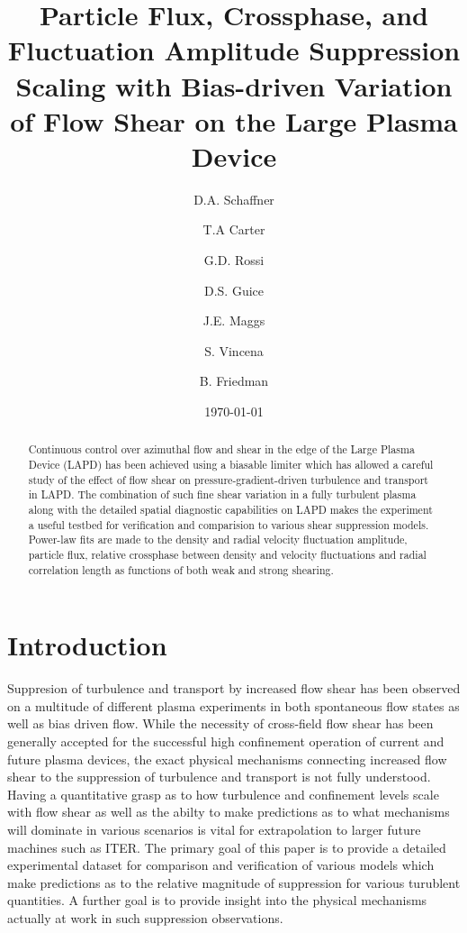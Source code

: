 \documentclass[aip,pop,amsmath,amssymb,reprint,superscriptaddress]{revtex4-1} %
\begin{document}
\title{Particle Flux, Crossphase, and Fluctuation Amplitude Suppression Scaling with Bias-driven Variation of Flow Shear on the Large Plasma Device}
\author{D.A. Schaffner}
\author{T.A Carter}
\author{G.D. Rossi}
\author{D.S. Guice}
\author{J.E. Maggs}
\author{S. Vincena}
\author{B. Friedman}
\date{\today}
\begin{abstract}
Continuous control over azimuthal flow and shear in the edge of the Large Plasma Device (LAPD) has been achieved using a biasable limiter which has allowed a careful study of the effect of flow shear on pressure-gradient-driven turbulence and transport in LAPD. The combination of such fine shear variation in a fully turbulent plasma along with the detailed spatial diagnostic capabilities on LAPD makes the experiment a useful testbed for verification and comparision to various shear suppression models. Power-law fits are made to the density and radial velocity fluctuation amplitude, particle flux, relative crossphase between density and velocity fluctuations and radial correlation length as functions of both weak and strong shearing. 
\end{abstract}
\maketitle

\section{Introduction}

Suppresion of turbulence and transport by increased flow shear has been observed on a multitude of different plasma experiments in both spontaneous flow states as well as bias driven flow. While the necessity of cross-field flow shear has been generally accepted for the successful high confinement operation of current and future plasma devices, the exact physical mechanisms connecting increased flow shear to the suppression of turbulence and transport is not fully understood. Having a quantitative grasp as to how turbulence and confinement levels scale with flow shear as well as the abilty to make predictions as to what mechanisms will dominate in various scenarios is vital for extrapolation to larger future machines such as ITER. The primary goal of this paper is to provide a detailed experimental dataset for comparison and verification of various models which make predictions as to the relative magnitude of suppression for various turublent quantities. A further goal is to provide insight into the physical mechanisms actually at work in such suppression observations.
\end{document}
